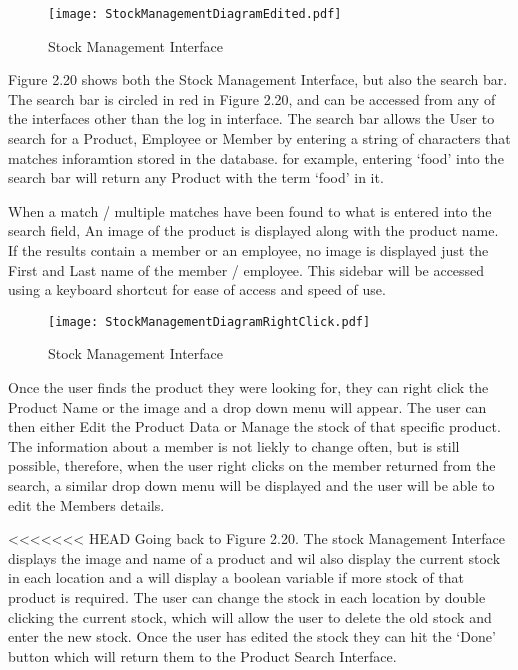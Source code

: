\begin{figure}[H]
\caption{Stock Management Interface} \label{fig:Stock Management Interface}
\hfill\texttt{[image: StockManagementDiagramEdited.pdf]}\hspace*{\fill}
\end{figure}

Figure 2.20 shows both the Stock Management Interface, but also the search bar. The search bar is circled in red in Figure 2.20, and can be accessed from any of the interfaces other than the log in interface. The search bar allows the User to search for a Product, Employee or Member by entering a string of characters that matches inforamtion stored in the database. for example, entering `food' into the search bar will return any Product with the term `food' in it. \par

  When a match / multiple matches have been found to what is entered into the search field, An image of the product is displayed along with the product name. If the results contain a member or an employee, no image is displayed just the First and Last name of the member / employee. This sidebar will be accessed using a keyboard shortcut for ease of access and speed of use. \par


\begin{figure}[H]
\caption{Stock Management Interface} \label{fig:Stock Management Interface}
\hfill\texttt{[image: StockManagementDiagramRightClick.pdf]}\hspace*{\fill}
\end{figure}

Once the user finds the product they were looking for, they can right click the Product Name or the image and a drop down menu will appear. The user can then either Edit the Product Data or Manage the stock of that specific product. The information about a member is not liekly to change often, but is still possible, therefore, when the user right clicks on the member returned from the search, a similar drop down menu will be displayed and the user will be able to edit the Members details. \par

<<<<<<< HEAD
Going back to Figure 2.20. The stock Management Interface displays the image and name of a product and wil also display the current stock in each location and a will display a boolean variable if more stock of that product is required. The user can change the stock in each location by double clicking the current stock, which will allow the user to delete the old stock and enter the new stock. Once the user has edited the stock they can hit the `Done' button which will return them to the Product Search Interface.\par


